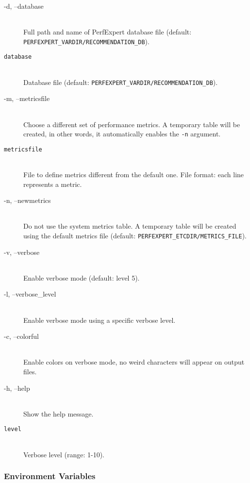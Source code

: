 \begin{description}
	\item[\btt -d, --database]\hfill \\
	Full path and name of PerfExpert database file (default: \texttt{PERFEXPERT\_VARDIR/RECOMMENDATION\_DB}).

	\item[\tt database]\hfill \\
	Database file (default: \texttt{PERFEXPERT\_VARDIR/RECOMMENDATION\_DB}).

	\item[\btt -m, --metricsfile]\hfill \\
	Choose a different set of performance metrics. A temporary table will be created, in other words, it automatically enables the \texttt{-n} argument.

	\item[\tt metricsfile]\hfill \\
	File to define metrics different from the default one. File format: each line represents a metric.

	\item[\btt -n, --newmetrics]\hfill \\
	Do not use the system metrics table. A temporary table will be created using the default metrics file (default: \texttt{PERFEXPERT\_ETCDIR/METRICS\_FILE}).

	\item[\btt -v, --verbose]\hfill \\
	Enable verbose mode (default: level 5).

	\item[\btt -l, --verbose\_level]\hfill \\
	Enable verbose mode using a specific verbose level.

	\item[\btt -c, --colorful]\hfill \\
	Enable colors on verbose mode, no weird characters will appear on output files.

	\item[\btt -h, --help]\hfill \\
	Show the help message.

	\item[\tt level]\hfill \\
	Verbose level (range: 1-10).
\end{description}

\subsubsection{Environment Variables}

